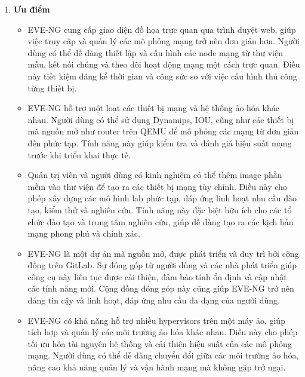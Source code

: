 \documentclass[13pt]{article}
\begin{document}
\begin{enumerate}
    \item \textbf{Ưu điểm}
    \begin{itemize}
        \item EVE-NG cung cấp giao diện đồ họa trực quan qua trình duyệt web, giúp việc truy cập và quản lý các mô phỏng mạng trở nên đơn giản hơn. Người dùng có thể dễ dàng thiết lập và cấu hình các node mạng từ thư viện mẫu, kết nối chúng và theo dõi hoạt động mạng một cách trực quan. Điều này tiết kiệm đáng kể thời gian và công sức so với việc cấu hình thủ công từng thiết bị.
        \item EVE-NG hỗ trợ một loạt các thiết bị mạng và hệ thống ảo hóa khác nhau. Người dùng có thể sử dụng Dynamips, IOU, cũng như các thiết bị mã nguồn mở như router trên QEMU để mô phỏng các mạng từ đơn giản đến phức tạp. Tính năng này giúp kiểm tra và đánh giá hiệu suất mạng trước khi triển khai thực tế.
        \item Quản trị viên và người dùng có kinh nghiệm có thể thêm image phần mềm vào thư viện để tạo ra các thiết bị mạng tùy chỉnh. Điều này cho phép xây dựng các mô hình lab phức tạp, đáp ứng linh hoạt nhu cầu đào tạo, kiểm thử và nghiên cứu. Tính năng này đặc biệt hữu ích cho các tổ chức đào tạo và trung tâm nghiên cứu, giúp dễ dàng tạo ra các kịch bản mạng phong phú và chính xác.
        \item EVE-NG là một dự án mã nguồn mở, được phát triển và duy trì bởi cộng đồng trên GitLab. Sự đóng góp từ người dùng và các nhà phát triển giúp công cụ này liên tục được cải thiện, đảm bảo tính ổn định và cập nhật các tính năng mới. Cộng đồng đóng góp này cũng giúp EVE-NG trở nên đáng tin cậy và linh hoạt, đáp ứng nhu cầu đa dạng của người dùng.
        \item EVE-NG có khả năng hỗ trợ nhiều hypervisors trên một máy ảo, giúp tích hợp và quản lý các môi trường ảo hóa khác nhau. Điều này cho phép tối ưu hóa tài nguyên hệ thống và cải thiện hiệu suất của các mô phỏng mạng. Người dùng có thể dễ dàng chuyển đổi giữa các môi trường ảo hóa, nâng cao khả năng quản lý và vận hành mạng mà không gặp trở ngại.
    \end{itemize}


\end{enumerate}
\end{document}
